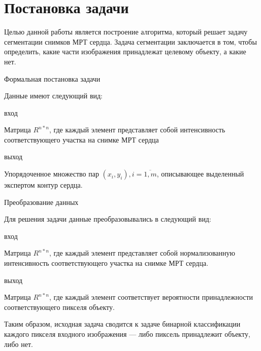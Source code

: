 \section{Постановка задачи}

Целью данной работы является построение алгоритма, который решает задачу сегментации снимков МРТ сердца. Задача сегментации заключается в том, чтобы определить, какие части изображения принадлежат целевому объекту, а какие нет. 

Формальная постановка задачи

Данные имеют следующий вид:

вход 

Матрица $R^{n*n}$, где каждый элемент представляет собой интенсивность соответствующего участка на снимке МРТ сердца

выход

Упорядоченное множество пар $(x_i,y_i), i = \overline{1,m}$, описывающее выделенный экспертом контур сердца.

Преобразование данных

Для решения задачи данные преобразовывались в следующий вид:

вход

Матрица $R^{n*n}$, где каждый элемент представляет собой нормализованную интенсивность соответствующего участка на снимке МРТ сердца.

выход

Матрица $R^{n*n}$, где каждый элемент соответствует вероятности принадлежности соответствующего пикселя объекту. 

Таким образом, исходная задача сводится к задаче бинарной классификации каждого пикселя входного изображения — либо пиксель принадлежит объекту, либо нет.
